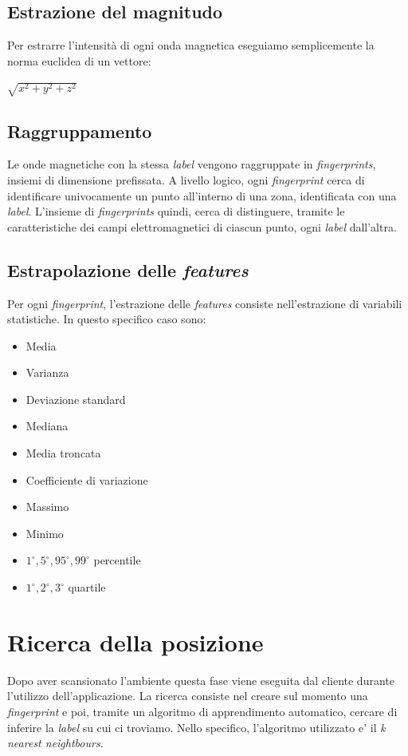 \subsection*{Estrazione del magnitudo}
Per estrarre l'intensit\`{a} di ogni onda magnetica eseguiamo semplicemente la norma euclidea di un vettore:\\
\begin{center}
	$ \sqrt{x^2 + y^2 + z^2}$
\end{center}

\subsection*{Raggruppamento}
Le onde magnetiche con la stessa \textit{label} vengono raggruppate in \textit{fingerprints}, insiemi di dimensione prefissata. A livello logico, ogni \textit{fingerprint} cerca di identificare univocamente un punto all'interno di una zona, identificata con una \textit{label}. L'insieme di \textit{fingerprints} quindi, cerca di distinguere, tramite le caratteristiche dei campi elettromagnetici di ciascun punto, ogni \textit{label} dall'altra.

\subsection*{Estrapolazione delle \textit{features}}
Per ogni \textit{fingerprint}, l'estrazione delle \textit{features} consiste nell'estrazione di variabili statistiche. In questo specifico caso sono:
\begin{itemize}
	\item Media
	\item Varianza
	\item Deviazione standard
	\item Mediana
	\item Media troncata
	\item Coefficiente di variazione
	\item Massimo
	\item Minimo
	\item $ 1^{\circ}, 5^{\circ}, 95^{\circ}, 99^{\circ} $ percentile
	\item $ 1^{\circ}, 2^{\circ}, 3^{\circ} $ quartile
\end{itemize}



\section*{Ricerca della posizione}
Dopo aver scansionato l'ambiente questa fase viene eseguita dal cliente durante l'utilizzo dell'applicazione. La ricerca consiste nel creare sul momento una \textit{fingerprint} e poi, tramite un algoritmo di apprendimento automatico, cercare di inferire la \textit{label}  su cui ci troviamo. Nello specifico, l'algoritmo utilizzato e' il \textit{k nearest neightbours}.
\newpage

